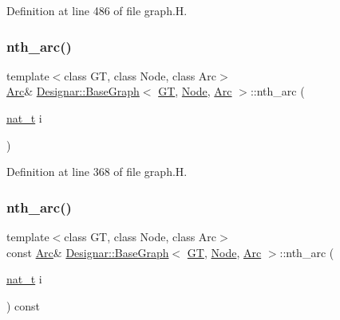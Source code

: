 Definition at line 486 of file graph.\+H.

\mbox{\label{class_designar_1_1_base_graph_a205d350fd588082a84d7a114ffd7cf5e}} 
\subsubsection{\texorpdfstring{nth\+\_\+arc()}{nth\_arc()}\hspace{0.1cm}{\footnotesize\ttfamily [1/2]}}
{\footnotesize\ttfamily template$<$class GT, class Node, class Arc$>$ \\
\hyperlink{namespace_designar_a3f55fb5513d62ff47cbc8f72b8e95d6f}{Arc}\& \hyperlink{class_designar_1_1_base_graph}{Designar\+::\+Base\+Graph}$<$ \hyperlink{demo-buildgraph_8_c_a3001c40d2c31ca87ed96cd7d1334a55e}{GT}, \hyperlink{namespace_designar_a5af326c65aa2bd26b26c410f2030d09e}{Node}, \hyperlink{namespace_designar_a3f55fb5513d62ff47cbc8f72b8e95d6f}{Arc} $>$\+::nth\+\_\+arc (\begin{DoxyParamCaption}\item[{\hyperlink{namespace_designar_aa72662848b9f4815e7bf31a7cf3e33d1}{nat\+\_\+t}}]{i }\end{DoxyParamCaption})\hspace{0.3cm}{\ttfamily [inline]}}



Definition at line 368 of file graph.\+H.

\mbox{\label{class_designar_1_1_base_graph_aaff3c76e0e0094d4ec1eaecd155ca951}} 
\subsubsection{\texorpdfstring{nth\+\_\+arc()}{nth\_arc()}\hspace{0.1cm}{\footnotesize\ttfamily [2/2]}}
{\footnotesize\ttfamily template$<$class GT, class Node, class Arc$>$ \\
const \hyperlink{namespace_designar_a3f55fb5513d62ff47cbc8f72b8e95d6f}{Arc}\& \hyperlink{class_designar_1_1_base_graph}{Designar\+::\+Base\+Graph}$<$ \hyperlink{demo-buildgraph_8_c_a3001c40d2c31ca87ed96cd7d1334a55e}{GT}, \hyperlink{namespace_designar_a5af326c65aa2bd26b26c410f2030d09e}{Node}, \hyperlink{namespace_designar_a3f55fb5513d62ff47cbc8f72b8e95d6f}{Arc} $>$\+::nth\+\_\+arc (\begin{DoxyParamCaption}\item[{\hyperlink{namespace_designar_aa72662848b9f4815e7bf31a7cf3e33d1}{nat\+\_\+t}}]{i }\end{DoxyParamCaption}) const\hspace{0.3cm}{\ttfamily [inline]}}



